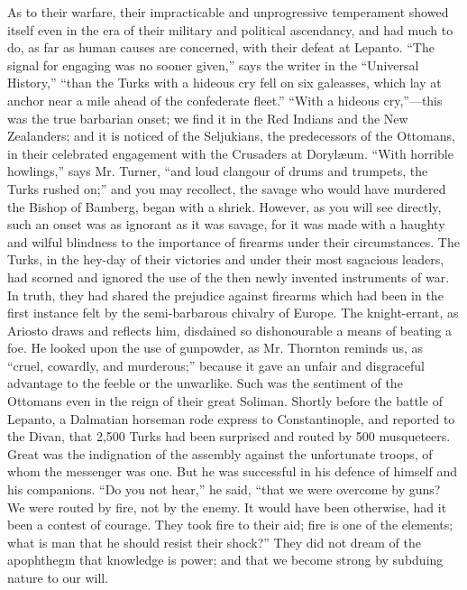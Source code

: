 As to their warfare, their
impracticable and unprogressive temperament showed itself even in the
era of their military and political ascendancy, and had much to do, as
far as human causes are concerned, with their defeat at Lepanto. ``The
signal for engaging was no sooner given,'' says the writer in the ``Universal
History,'' ``than the Turks with a hideous cry fell on six galeasses,
which lay at anchor near a mile ahead of the confederate fleet.'' ``With
a hideous cry,''—this was the true barbarian onset; we find it in the
Red Indians and the New Zealanders; and it is noticed of the
Seljukians, the predecessors of the Ottomans, in their celebrated
engagement with the Crusaders at Dorylæum. ``With horrible howlings,''
says Mr. Turner, ``and loud clangour of drums and trumpets, the Turks
rushed on;'' and you may recollect, the savage who would have murdered
the Bishop of Bamberg, began with a shriek. However, as you will see
directly, such an onset was as ignorant as it was savage, for it was
made with a haughty and wilful blindness to the importance of firearms
under their circumstances. The Turks, in the hey-day of their
victories and under their most sagacious leaders, had scorned
and ignored the use of the then newly invented instruments of war. In
truth, they had shared the prejudice against firearms which had been
in the first instance felt by the semi-barbarous chivalry of Europe.
The knight-errant, as Ariosto draws and reflects him, disdained so
dishonourable a means of beating a foe. He looked upon the use of
gunpowder, as Mr. Thornton reminds us, as ``cruel, cowardly, and
murderous;'' because it gave an unfair and disgraceful advantage to the
feeble or the unwarlike. Such was the sentiment of the Ottomans even
in the reign of their great Soliman. Shortly before the battle of
Lepanto, a Dalmatian horseman rode express to Constantinople, and
reported to the Divan, that 2,500 Turks had been surprised and routed
by 500 musqueteers. Great was the indignation of the assembly against
the unfortunate troops, of whom the messenger was one. But he was
successful in his defence of himself and his companions. ``Do you not
hear,'' he said, ``that we were overcome by guns? We were routed by
fire, not by the enemy. It would have been otherwise, had it been a
contest of courage. They took fire to their aid; fire is one of the
elements; what is man that he should resist their shock?'' They did not
dream of the apophthegm that knowledge is power; and that we become
strong by subduing nature to our will.

